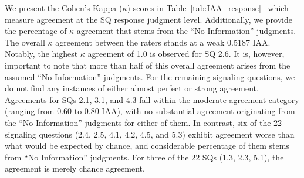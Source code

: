 \documentclass[sn-mathphys,Numbered]{sn-jnl}%
\theoremstyle{thmstyleone}%
\theoremstyle{thmstyletwo}%
\theoremstyle{thmstylethree}%
\begin{document}
We present the Cohen's Kappa ($\kappa$) scores in Table~\ref{tab:IAA_response}~\cite{mchugh2012interrater} which measure agreement at the SQ response judgment level.
Additionally, we provide the percentage of $\kappa$ agreement that stems from the ``No Information'' judgments.
The overall $\kappa$ agreement between the raters stands at a weak 0.5187 IAA.
Notably, the highest $\kappa$ agreement of 1.0 is observed for SQ 2.6.
It is, however, important to note that more than half of this overall agreement arises from the assumed ``No Information'' judgments.
For the remaining signaling questions, we do not find any instances of either almost perfect or strong agreement.
Agreements for SQs 2.1, 3.1, and 4.3 fall within the moderate agreement category (ranging from 0.60 to 0.80 IAA), with no substantial agreement originating from the ``No Information'' judgments for either of them.
In contrast, six of the 22 signaling questions (2.4, 2.5, 4.1, 4.2, 4.5, and 5.3) exhibit agreement worse than what would be expected by chance, and considerable percentage of them stems from ``No Information'' judgments.
For three of the 22 SQs (1.3, 2.3, 5.1), the agreement is merely chance agreement.
\end{document}
